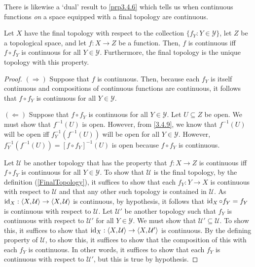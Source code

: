 There is likewise a `dual' result to \cref{prp3.4.6} which tells us when continuous functions \emph{on} a space equipped with a final topology are continuous.
\begin{prp}\label{prp3.4.34x}
Let $X$ have the final topology with respect to the collection $\{ f_Y:Y\in \mathcal{Y}\}$, let $Z$ be a topological space, and let $f:X\rightarrow Z$ be a function.  Then, $f$ is continuous iff $f\circ f_Y$ is continuous for all $Y\in \mathcal{Y}$.  Furthermore, the final topology is the unique topology with this property.
\begin{proof}
$(\Rightarrow )$ Suppose that $f$ is continuous.  Then, because each $f_Y$ is itself continuous and compositions of continuous functions are continuous, it follows that $f\circ f_Y$ is continuous for all $Y\in \mathcal{Y}$.

\blankline
\noindent
$(\Leftarrow )$ Suppose that $f\circ f_Y$ is continuous for all $Y\in \mathcal{Y}$.  Let $U\subseteq Z$ be open.  We must show that $f^{-1}(U)$ is open.  However, from \eqref{3.4.9}, we know that $f^{-1}(U)$ will be open iff $f_Y^{-1}\left( f^{-1}(U)\right)$ will be open for all $Y\in \mathcal{Y}$.  However, $f_Y^{-1}\left( f^{-1}(U)\right) =[f\circ f_Y]^{-1}(U)$ is open because $f\circ f_Y$ is continuous.

\blankline
\noindent
Let $\mathcal{U}$ be another topology that has the property that $f:X\rightarrow Z$ is continuous iff $f\circ f_Y$ is continuous for all $Y\in \mathcal{Y}$.  To show that $\mathcal{U}$ is the final topology, by the definition (\cref{FinalTopology}), it suffices to show that each $f_Y:Y\rightarrow X$ is continuous with respect to $\mathcal{U}$ and that any other such topology is contained in $\mathcal{U}$.  As $\operatorname{id} _X:\langle X,\mathcal{U}\rangle\rightarrow \langle X,\mathcal{U}\rangle$ is continuous, by hypothesis, it follows that $\operatorname{id} _X\circ f_Y=f_Y$ is continuous with respect to $\mathcal{U}$.  Let $\mathcal{U}'$ be another topology such that $f_Y$ is continuous with respect to $\mathcal{U}'$ for all $Y\in \mathcal{Y}$.  We must show that $\mathcal{U}'\subseteq \mathcal{U}$.  To show this, it suffices to show that $\operatorname{id} _X:\langle X,\mathcal{U}\rangle\rightarrow \langle X,\mathcal{U}'\rangle$ is continuous.  By the defining property of $\mathcal{U}$, to show this, it suffices to show that the composition of this with each $f_Y$ is continuous.  In other words, it suffices to show that each $f_Y$ is continuous with respect to $\mathcal{U}'$, but this is true by hypothesis.
\end{proof}
\end{prp}

